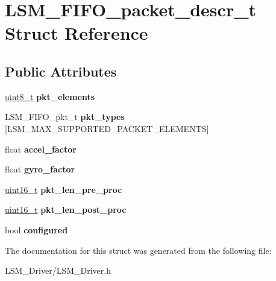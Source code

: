 \hypertarget{structLSM__FIFO__packet__descr__t}{}\section{L\+S\+M\+\_\+\+F\+I\+F\+O\+\_\+packet\+\_\+descr\+\_\+t Struct Reference}
\label{structLSM__FIFO__packet__descr__t}
\subsection*{Public Attributes}
\begin{DoxyCompactItemize}
\item 
\mbox{\label{structLSM__FIFO__packet__descr__t_ad3f957e3bdc91a13dea035e0b11f73aa}} 
\hyperlink{vl53l0x__types_8h_aba7bc1797add20fe3efdf37ced1182c5}{uint8\+\_\+t} {\bfseries pkt\+\_\+elements}
\item 
\mbox{\label{structLSM__FIFO__packet__descr__t_a023cf9d8d8b25245400e64297d6ef229}} 
L\+S\+M\+\_\+\+F\+I\+F\+O\+\_\+pkt\+\_\+t {\bfseries pkt\+\_\+types} \mbox{[}L\+S\+M\+\_\+\+M\+A\+X\+\_\+\+S\+U\+P\+P\+O\+R\+T\+E\+D\+\_\+\+P\+A\+C\+K\+E\+T\+\_\+\+E\+L\+E\+M\+E\+N\+TS\mbox{]}
\item 
\mbox{\label{structLSM__FIFO__packet__descr__t_ad791528875028c40d2ba66fcc7f01985}} 
float {\bfseries accel\+\_\+factor}
\item 
\mbox{\label{structLSM__FIFO__packet__descr__t_a32a51728c502df7755e302d8179107cb}} 
float {\bfseries gyro\+\_\+factor}
\item 
\mbox{\label{structLSM__FIFO__packet__descr__t_a3e13da3e5835ba5ee0302bbd7afc2809}} 
\hyperlink{vl53l0x__types_8h_a273cf69d639a59973b6019625df33e30}{uint16\+\_\+t} {\bfseries pkt\+\_\+len\+\_\+pre\+\_\+proc}
\item 
\mbox{\label{structLSM__FIFO__packet__descr__t_af8903da9bc199b10328e4e40d5bde87f}} 
\hyperlink{vl53l0x__types_8h_a273cf69d639a59973b6019625df33e30}{uint16\+\_\+t} {\bfseries pkt\+\_\+len\+\_\+post\+\_\+proc}
\item 
\mbox{\label{structLSM__FIFO__packet__descr__t_a326857f83aaddfc63e63d99a9e9d15b1}} 
bool {\bfseries configured}
\end{DoxyCompactItemize}


The documentation for this struct was generated from the following file\+:\begin{DoxyCompactItemize}
\item 
L\+S\+M\+\_\+\+Driver/L\+S\+M\+\_\+\+Driver.\+h\end{DoxyCompactItemize}
